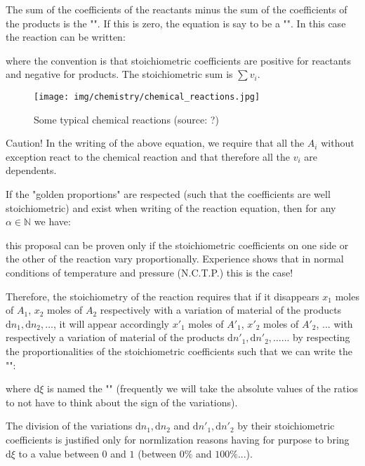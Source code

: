 	The sum of the coefficients of the reactants minus the sum of the coefficients of the products is the "\label{stoichiometric sum}". If this is zero, the equation is say to be a "". In this case the reaction can be written:
	
	where the convention is that stoichiometric coefficients are positive for reactants and negative for products. The stoichiometric sum is $\sum v_i$.
	\begin{figure}[H]
		\centering
		\texttt{[image: img/chemistry/chemical\_reactions.jpg]}
		\caption{Some typical chemical reactions (source: ?)}
	\end{figure}
	Caution! In the writing of the above equation, we require that all the $A_i$ without exception react to the chemical reaction and that therefore all the $v_i$ are dependents.
	
	If the "golden proportions" are respected (such that the coefficients are well stoichiometric) and exist when writing of the reaction equation, then for any $\alpha \in \mathbb{N}$ we have:
	
	this proposal can be proven only if the stoichiometric coefficients on one side or the other of the reaction vary proportionally. Experience shows that in normal conditions of temperature and pressure (N.C.T.P.) this is the case!
	
	Therefore, the stoichiometry of the reaction requires that if it disappears $x_1$ moles of $A_1$, $x_2$ moles of $A_2$  respectively with a variation of material of the products $\mathrm{d}n_1,\mathrm{d}n_2,\ldots $, it will appear accordingly ${x'}_1$ moles of ${A'}_1$, ${x'}_2$ moles of ${A'}_2$, ... with respectively a variation of material of the products $\mathrm{d}{n'}_1,\mathrm{d}{n'}_2,\ldots $... by respecting the proportionalities of the stoichiometric coefficients such that we can write the "":
	
	where $\mathrm{d}\xi$ is named the "" (frequently we will take the absolute values of the ratios to not have to think about the sign of the variations).
	
	The division of the variations $\mathrm{d}n_1,\mathrm{d}n_2$ and $\mathrm{d}{n'}_1,\mathrm{d}{n'}_2$  by their stoichiometric coefficients is justified only for normlization reasons having for purpose to bring $\mathrm{d}\xi$ to a value between $0$ and $1$ (between $0\%$ and $100\%$...).
	
